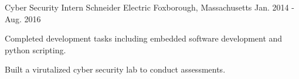 \begin{cventries}
  \cventry
    {Cyber Security Intern} %
    {Schneider Electric} %
    {Foxborough, Massachusetts} %
    {Jan. 2014 - Aug. 2016} %
    {
      \begin{cvitems} %
        \item {
          Completed development tasks including embedded software development and python scripting.
        }
        \item {
          Built a virutalized cyber security lab to conduct assessments.
        }
      \end{cvitems}
    }

\end{cventries}
